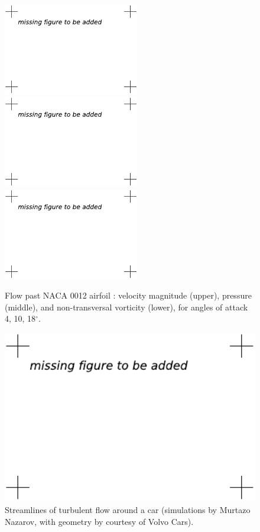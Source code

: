 \begin{figure}[bhpt]
{}
\centerline{
\includegraphics[height=4cm]{chapters/hoffman-1/pdf/naca_0012-vort1-xz-aoa4-bw.pdf}
\includegraphics[height=4cm]{chapters/hoffman-1/pdf/naca_0012-vort1-xz-aoa10-bw.pdf}
\includegraphics[height=4cm]{chapters/hoffman-1/pdf/naca_0012-vort1-xz-aoa18-bw.pdf}
}
\caption{Flow past NACA 0012 airfoil \cite{HoffmanJohnson2006}: velocity magnitude (upper), pressure (middle), and non-transversal vorticity (lower), for angles of attack 4, 10, 18$^\circ$.}
\label{fig:naca}
\end{figure}

\begin{figure}[bhpt]

\centerline{
\includegraphics[width=12cm]{chapters/hoffman-1/pdf/volvo_car-bw.pdf}
}
\caption{Streamlines of turbulent flow around a car (simulations by Murtazo Nazarov, with geometry by courtesy of Volvo Cars).}
\label{fig:volvo}
\end{figure}

